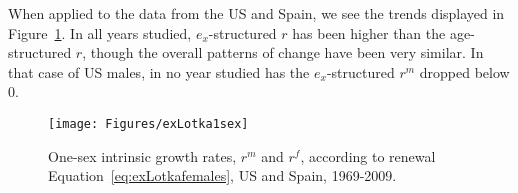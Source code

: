  When applied to the data from the US and Spain, we see the trends
displayed in Figure~\ref{fig:rex1sex}. In all years studied, $e_x$-structured
$r$ has been higher than the age-structured $r$, though the overall patterns of
change have been very similar. In that case of US males, in no year studied
has the $e_x$-structured $r^m$ dropped below 0.

\begin{figure}[!ht]
  \centering
    \caption{One-sex intrinsic growth rates, $r^m$ and $r^f$, according to
    renewal Equation~\eqref{eq:exLotkafemales}, US and Spain, 1969-2009.}
     \texttt{[image: Figures/exLotka1sex]}
     \label{fig:rex1sex}
\end{figure}